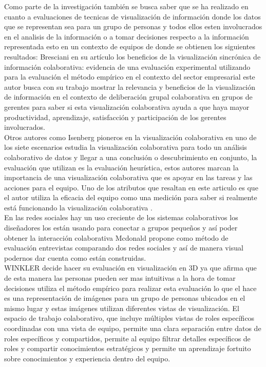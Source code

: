 Como parte de la investigación también se busca saber que se ha realizado en cuanto a evaluaciones de tecnicas de visualización de información donde los datos que se representan sea para un grupo de personas y todos ellos esten involucrados en el analisis de la información o a tomar decisiones respecto a la información representada esto en un contexto de equipos de donde se obtienen los siguientes resultados:
Bresciani en su artículo los beneficios de la visualización sincrónica de información colaborativa: evidencia de una evaluación experimental utilizando para la evaluación el método empírico en el contexto del  sector empresarial este autor busca con su trabajo mostrar la relevancia y beneficios de la visualización de información en el contexto de deliberación grupal colaborativa en grupos de gerentes para saber si esta visualización colaborativa ayuda a que haya mayor productividad, aprendizaje, satisfacción y  participación de los gerentes involucrados\cite{bresciani2009benefits}.\\
Otros autores como Isenberg pioneros en la visualización colaborativa en uno de los siete escenarios  estudia la visualización colaborativa para todo un análisis colaborativo de datos y llegar a una conclusión o descubrimiento en conjunto, la evaluación que utilizan es la evaluación heurística, estos autores marcan la importancia de una visualización colaborativa que es apoyar en las tareas y las acciones para el equipo. Uno de los atributos que resaltan en este articulo es que el autor utiliza la eficacia del equipo como una medición para saber si realmente está funcionando la visualización colaborativa \cite{lam2011empirical}.\\
En las redes sociales hay un uso creciente de los sistemas colaborativos los diseñadores los están usando para conectar a grupos pequeños y así poder obtener la interacción colaborativa Mcdonald propone como método de evaluación entrevistas comparando dos redes sociales y así de manera visual podernos dar cuenta como están construidas\cite{ mcdonald2003recommending}.\\
WINKLER decide hacer su evaluación en visualización en 3D ya que afirma que de esta manera las personas pueden ser mas intuitivas a la hora de tomar decisiones utiliza el método empírico para realizar esta evaluación lo que el hace es una representación de imágenes para un grupo de personas ubicados en el mismo lugar y estas imágenes utilizan diferentes vistas de visualización. El espacio de trabajo colaborativo, que incluye múltiples vistas de roles específicos coordinadas con una vista de equipo, permite una clara separación entre datos de roles específicos y compartidos, permite al equipo filtrar detalles específicos de roles y compartir conocimientos estratégicos y permite un aprendizaje fortuito sobre conocimientos y experiencia dentro del equipo\cite{ winkler2008collaborative}.

